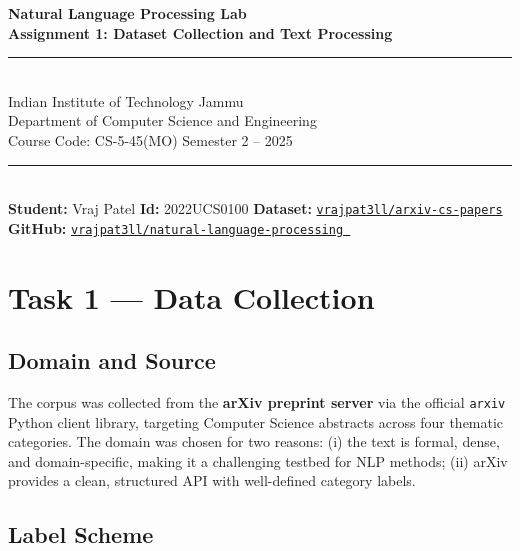 \documentclass[10pt,a4paper]{article}
\begin{document}
\begin{center}
    {\LARGE\bfseries\color{iitblue} Natural Language Processing Lab}\\[0.4em]
    {\large\bfseries Assignment 1: Dataset Collection and Text Processing}\\[0.6em]
    \rule{\linewidth}{1pt}\\[0.4em]
    {\normalsize
        Indian Institute of Technology Jammu\\
        Department of Computer Science and Engineering\\
        Course Code: CS-5-45(MO) \quad Semester 2 -- 2025
    }\\[0.3em]
    \rule{\linewidth}{0.4pt}\\[0.3em]
    {
    \normalsize\textbf{Student:} Vraj Patel \quad
    \normalsize\textbf{Id:} 2022UCS0100 \quad
     \textbf{Dataset:} \href{https://huggingface.co/datasets/vrajpat3ll/arxiv-cs-papers}{\texttt{vrajpat3ll/arxiv-cs-papers}} \quad \\
     \textbf{GitHub:} \href{https://github.com/vrajpat3ll/natural-language-processing}{\texttt{vrajpat3ll/natural-language-processing
     }}}
\end{center}

\vspace{0.5em}

\section{Task 1 --- Data Collection}

\subsection{Domain and Source}

The corpus was collected from the \textbf{arXiv preprint server} via the official \texttt{arxiv} Python client library, targeting Computer Science abstracts across four thematic categories. The domain was chosen for two reasons: (i) the text is formal, dense, and domain-specific, making it a challenging testbed for NLP methods; (ii) arXiv provides a clean, structured API with well-defined category labels.

\subsection{Label Scheme}
\end{document}
